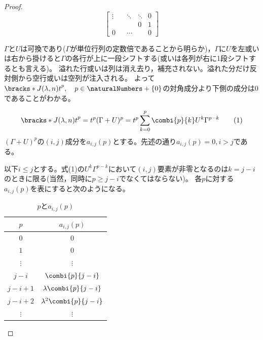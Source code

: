 {\begin{proof}
\[\begin{bmatrix}
                        \vdots    &    & \ddots    & \ddots    & 0\\
                                &     &             & 0            & 1\\
                        0        &     & \cdots    &             & 0
                    \end{bmatrix}
                \]
                \par
                $\Gamma$と$U$は可換であり($\Gamma$が単位行列の定数倍であることから明らか)，$\Gamma$に$U$を左或いは右から掛けると$\Gamma$の各行が上に一段シフトする(或いは各列が右に1段シフトするとも言える)。
                溢れた行或いは列は消え去り，補充されない。溢れた分だけ反対側から空行或いは空列が注入される。
                よって$\bracks*{J(\lambda, n)t}^p,\quad p\in\naturalNumbers+\{0\}$の対角成分より下側の成分は$0$であることがわかる。
                \par
                \begin{equation}
                    \bracks*{J(\lambda, n)t}^p = t^p(\Gamma+U)^p = t^p\sum_{k=0}^{p}{\combi{p}{k}U^k\Gamma^{p-k}} \tag{1}
                \end{equation}
                $(\Gamma+U)^p$の$(i,j)$成分を$a_{i,j}(p)$とする。先述の通り$a_{i,j}(p)=0,i>j$である。
                \par
                以下$i\leq j$とする。式(1)の$U^k\Gamma^{p-k}$において$(i,j)$要素が非零となるのは$k=j-i$のときに限る(当然，同時に$p\geq j-i$でなくてはならない)。
                各$p$に対する$a_{i,j}(p)$を表にすると次のようになる。
                \begin{table}[H]
                    \centering
                    \caption{$p$と$a_{i,j}(p)$}
                    \begin{tabular}{cc}
                        $p$            & $a_{i,j}(p)$ \\\hline\hline
                        $0$            & $0$\\
                        $1$            & $0$\\
                        $\vdots$    & $\vdots$\\
                        $j-i$        & $\combi{p}{j-i}$\\
                        $j-i+1$        & $\lambda\combi{p}{j-i}$\\
                        $j-i+2$        & $\lambda^2\combi{p}{j-i}$\\
                        $\vdots$    & $\vdots$\\

\end{tabular}
\end{table}
\end{proof}}
